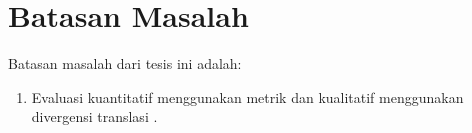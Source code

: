\section{Batasan Masalah}

Batasan masalah dari tesis ini adalah:
\begin{enumerate}
    \item Evaluasi kuantitatif menggunakan metrik \SMATCH{}  dan kualitatif menggunakan divergensi translasi .
\end{enumerate}
